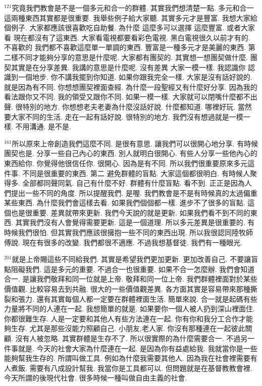 \documentclass{book}
\begin{document}
$^{121}$究竟我們教會是不是一個多元和合一的群體.
其實我們想清楚一點.
多元和合一這兩種東西其實都是很重要.
我舉些例子給大家聽.
其實多元才是豐富.
我想大家給個例子.
大家都應該很喜歡吃自助餐.
為什麼 這麼多可以選擇 這麼豐富.
或者大家看 現在都沒有了這東西.
大家看電視都要看彩色電視.
黑白電視很久以前才有的.
不喜歡的 我們都不喜歡這麼單一單調的東西.
豐富是一種多元才是美麗的東西.
第二樣不同才能夠分享的意思是什麼呢.
大家都有團契的.
其實想一想團契做什麼.
團契其實是在分享差異.
我講的意思是什麼呢.
沒有差異 大家一模一樣.
我認識你 認識到一個地步.
你不講我擺到你知道.
如果你跟我完全一樣.
大家是沒有話好說的.
就是因為有不同.
你想想團契裡面查經.
為什麼一段聖經又有什麼好分享.
因為我的看法跟你又不同.
我的領受又跟你不同.
如果一模一樣.
大家就可以閉嘴什麼都不出聲.
很特別的地方.
你想想老夫老妻為什麼沒話好說.
什麼都知道.
哪裡好玩.
當然要大家不同的生活.
走在一起有話好說.
很特別的地方.
我們沒有想過就是一模一樣.
不用溝通.
是不是.

$^{161}$所以原來上帝創造我們這麼不同.
是很有意思.
讓我們可以很開心地分享.
有時候團契也是.
分享一些自己內心的東西.
別人就明白很開心.
有些人分享一些他內心的東西給你.
你覺得他很信任你.
很開心.
因為是有不同.
所以我們很重要原來多元這件事.
不同是很重要的東西.
第二 避免群體的盲點.
大家這個都很明白.
有時候人聚得多.
全部都同聲同氣.
自己有什麼不好.
群體有什麼盲點.
看不到.
正正是因為人們提出一些不同的角度.
所以提醒我們.
是喔.
我們教會是不是有時候真的太過偏重某些東西.
為什麼我們會這樣去看.
如果我們個個都一樣.
進步不了很多的盲點.
這個也是很重要.
差異就帶來更新.
我們今天說的就是更新.
如果我們看不到不同的東西.
其實我們沒有人會覺得需要更新.
這是一個道理.
所以多元差異是很重要的.
有時候我們很怕.
但其實我們應該很擁抱一些不同的東西出現.
所以我很認同陸牧師傅說.
現在有很多的改變.
我們都很不適應.
不過我想基督徒.
我們有一種眼光.

$^{201}$就是上帝賜這些不同給我們.
其實是希望我們更加更新.
更加改善自己.
不要讓盲點阻礙我們.
這是多元的重要.
不過合一也很重要.
如果不合一怎麼辦.
我們會知道合一.
是讓我們敬拜和同一位就是上帝.
敬拜和同一位上帝.
我們群體裡面對於某些價值觀.
比較容易去到共融.
很大的一些價值觀差異.
各方面其實是容易帶來那種撕裂和張力.
還有其實每個人都一定要在群體裡面生活.
簡單來說.
合一就是起碼有些力量將不同的人連在一起.
我想簡單的就是.
如果要你一個人被人扔到深山裡面住.
你都很難生存.
人是一定要和其他人有些方法連在一起.
你有你和我分工合作才能夠生存.
尤其是那些沒能力照顧自己.
小朋友,老人家.
你沒有那種連在一起彼此關顧.
沒有人被忽略.
其實群體是生存不了.
所以很實際的為什麼需要合一.
不過另一件事就是.
今天的社會大家為什麼連在一起.
是因為你有益處給我.
我就當你是一些能夠幫我生存的.
所謂叫做工具.
例如為什麼我需要其他人.
因為我在社會裡需要有人煮飯.
需要有八成設計幫我.
我當你是工具都可以.
但問題就是在基督教教會裡.
今天所謂的後現代社會.
很多時候一種叫做自由主義的社會.
\end{document}
